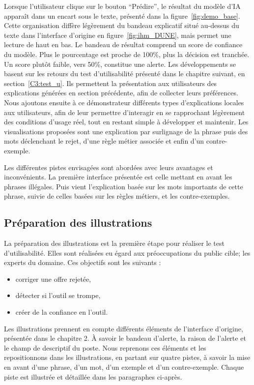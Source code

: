 Lorsque l'utilisateur clique sur le bouton ``Prédire'', le résultat du modèle d'IA apparaît dans un encart sous le texte, présenté dans la figure~\ref{fig:demo_base}. Cette organisation diffère légèrement du bandeau explicatif situé au-dessus du texte dans l'interface d'origine en figure~\ref{fig:ihm_DUNE}, mais permet une lecture de haut en bas.
Le bandeau de résultat comprend un score de confiance du modèle. Plus le pourcentage est proche de 100\%, plus la décision est tranchée. Un score plutôt faible, vers 50\%, constitue une alerte.
Les développements se basent sur les retours du test d'utilisabilité présenté dans le chapitre suivant, en section~\ref{C3:test_u}.
Ils permettent la présentation aux utilisateurs des explications générées en section précédente, afin de collecter leurs préférences.
Nous ajoutons ensuite à ce démonstrateur différents types d'explications locales aux utilisateurs, afin de leur permettre d'interagir en se rapprochant légèrement des conditions d'usage réel, tout en restant simple à développer et maintenir. Les visualisations proposées sont une explication par surlignage de la phrase puis des mots déclenchant le rejet, d'une règle métier associée et enfin d'un contre-exemple.%

Les différentes pistes envisagées sont abordées avec leurs avantages et inconvénients.
La première interface présentée est celle mettant en avant les phrases illégales. Puis vient l'explication basée sur les mots importants de cette phrase, suivie de celles basées sur les règles métiers, et les contre-exemples.

\subsection{Préparation des illustrations} \label{C2:preparation}

La préparation des illustrations est la première étape pour réaliser le test d'utilisabilité. Elles sont réalisées eu égard aux préoccupations du public cible; les experts du domaine. Ces objectifs sont les suivants :
\begin{itemize}
    \item corriger une offre rejetée,
    \item détecter si l’outil se trompe,
    \item créer de la confiance en l'outil.
\end{itemize}

Les illustrations prennent en compte différents éléments de l'interface d'origine, présentée dans le chapitre 2. À savoir le bandeau d'alerte, la raison de l'alerte et le champ de descriptif du poste.
Nous reprenons ces éléments et les repositionnons dans les illustrations, en partant sur quatre pistes, à savoir la mise en avant d'une phrase, d'un mot, d'un exemple et d'un contre-exemple. Chaque piste est illustrée et détaillée dans les paragraphes ci-après.

